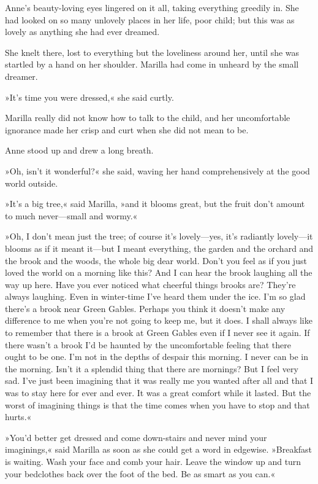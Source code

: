 Anne’s beauty-loving eyes lingered on it all, taking everything greedily in. She had looked on so many unlovely places in her life, poor child; but this was as lovely as anything she had ever dreamed.

She knelt there, lost to everything but the loveliness around her, until she was startled by a hand on her shoulder. Marilla had come in unheard by the small dreamer.

»It’s time you were dressed,« she said curtly.

Marilla really did not know how to talk to the child, and her uncomfortable ignorance made her crisp and curt when she did not mean to be.

Anne stood up and drew a long breath.

»Oh, isn’t it wonderful?« she said, waving her hand comprehensively at the good world outside.

»It’s a big tree,« said Marilla, »and it blooms great, but the fruit don’t amount to much never—small and wormy.«

»Oh, I don’t mean just the tree; of course it’s lovely—yes, it’s radiantly lovely—it blooms as if it meant it—but I meant everything, the garden and the orchard and the brook and the woods, the whole big dear world. Don’t you feel as if you just loved the world on a morning like this? And I can hear the brook laughing all the way up here. Have you ever noticed what cheerful things brooks are? They’re always laughing. Even in winter-time I’ve heard them under the ice. I’m so glad there’s a brook near Green Gables. Perhaps you think it doesn’t make any difference to me when you’re not going to keep me, but it does. I shall always like to remember that there is a brook at Green Gables even if I never see it again. If there wasn’t a brook I’d be haunted by the uncomfortable feeling that there ought to be one. I’m not in the depths of despair this morning. I never can be in the morning. Isn’t it a splendid thing that there are mornings? But I feel very sad. I’ve just been imagining that it was really me you wanted after all and that I was to stay here for ever and ever. It was a great comfort while it lasted. But the worst of imagining things is that the time comes when you have to stop and that hurts.«

»You’d better get dressed and come down-stairs and never mind your imaginings,« said Marilla as soon as she could get a word in edgewise. »Breakfast is waiting. Wash your face and comb your hair. Leave the window up and turn your bedclothes back over the foot of the bed. Be as smart as you can.«


